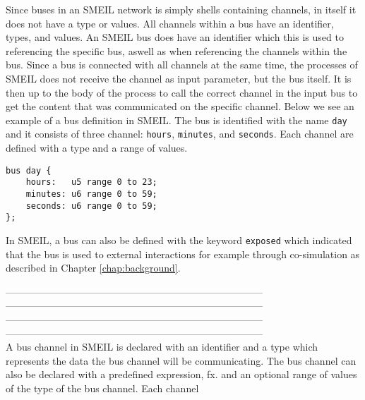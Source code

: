 Since buses in an SMEIL network is simply shells containing channels, in itself it does not have a type or values. All channels within a bus have an identifier, types, and values. An SMEIL bus does have an identifier which this is used to referencing the specific bus, aswell as when referencing the channels within the bus. Since a bus is connected with all channels at the same time, the processes of SMEIL does not receive the channel as input parameter, but the bus itself. It is then up to the body of the process to call the correct channel in the input bus to get the content that was communicated on the specific channel.
Below we see an example of a bus definition in SMEIL. The bus is identified with the name \texttt{day} and it consists of three channel: \texttt{hours}, \texttt{minutes}, and \texttt{seconds}. Each channel are defined with a type and a range of values.
\begin{verbatim}
bus day {
    hours:   u5 range 0 to 23;
    minutes: u6 range 0 to 59;
    seconds: u6 range 0 to 59;
};
\end{verbatim}

In SMEIL, a bus can also be defined with the keyword \texttt{exposed} which indicated that the bus is used to external interactions for example through co-simulation as described in Chapter \ref{chap:background}.


------------------------------------------------------------------------------\\
------------------------------------------------------------------------------\\
------------------------------------------------------------------------------\\
------------------------------------------------------------------------------\\









A bus channel in SMEIL is declared with an identifier and a type which represents the data the bus channel will be communicating. The bus channel can also be declared with a predefined expression, fx. %
and an optional range of values of the type of the bus channel.
Each channel

